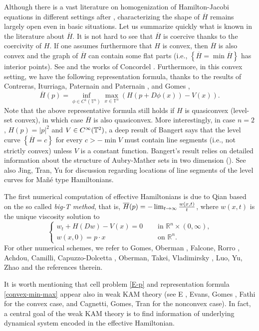 \documentclass[12pt,reqno]{amsart}
\theoremstyle{plain}
\theoremstyle{remark}
\numberwithin{equation}{section}
\newcommand{\R}{\mathbb{R}}
\newcommand{\T}{\mathbb{T}}
\newcommand{\ol}{\overline}
\begin{document}
Although there is a vast literature on homogenization of Hamilton-Jacobi equations in different settings after \cite{LPV},  characterizing the shape of $\ol H$ remains largely open even in  basic situations. 
Let us summarize quickly what is known in the literature about $\ol{H}$.
It is not hard to see that $\ol{H}$ is coercive thanks to the coercivity of $H$.
If one assumes furthermore that $H$ is convex, then $\ol{H}$ is also convex and the graph of $\ol{H}$ can contain some flat parts (i.e., $\left\{\ol H=\min \ol H\right\}$ has interior points). See \cite{LPV} and the works of Concordel \cite{Con1,Con2}. Furthermore, in this convex setting, we have the following representation formula, thanks to the results of 
Contreras, Iturriaga, Paternain and Paternain \cite{CIPP}, and Gomes \cite{Gom},
\begin{equation}\label{convex-min-max}
\ol{H}(p) = \inf_{\phi \in C^1(\T^n)} \max_{x\in \T^n} \left ( H(p+D\phi(x))- V(x) \right).
\end{equation}
Note that  the above representative formula still holds if $H$ is quasiconvex (level-set convex),
in which case $\ol{H}$ is also quasiconvex.  
More interestingly,  in case $n=2$, $H(p)=|p|^2$ and $V\in C^{\infty}(\Bbb T^2)$,  
a deep result of Bangert \cite{B2} says that the level curve $\left\{\ol H=c\right\}$ for every $c>-\min V$ must contain line segments (i.e., not strictly convex) unless $V$ is a constant function.   Bangert's result relies on detailed information about the structure of Aubry-Mather sets in two dimension (\cite{B1}).  See also Jing, Tran, Yu \cite{JTY} for discussion regarding locations of  line segments of the level curves for Ma\~n\'e type Hamiltonians.  

The first numerical computation of effective Hamiltonians  is due to  Qian \cite{Qi} based on the so called {\it big-T method}, that is,  $\ol H(p)=-\lim_{t\to \infty} {w(x,t)\over t}$,
where $w(x,t)$ is the unique viscosity solution to 
\[
\begin{cases}
w_t+H(Dw)-V(x)=0 \quad &\text{ in $\R^n\times (0, \infty)$,}\\
w(x,0)=p\cdot x  \quad &\text{ on $\R^n$}.
\end{cases}
\]
For other numerical schemes,  we refer to Gomes, Oberman \cite{GO}, 
Falcone, Rorro \cite{FR}, 
Achdou, Camilli, Capuzzo-Dolcetta \cite{ACC},
Oberman, Takei, Vladimirsky \cite{OTV}, Luo, Yu, Zhao \cite{LYZ}
and the references therein.

It is worth mentioning that cell problem \eqref{E-p} and representation formula \eqref{convex-min-max} 
appear also in weak KAM theory (see E \cite{E}, Evans, Gomes \cite{EvG},
Fathi \cite{Fa} for the convex case, and Cagnetti, Gomes, Tran \cite{CGT} for the nonconvex case).  
In fact,  a central goal of the weak KAM theory is to find information of underlying dynamical system encoded in the effective Hamiltonian.  
\end{document}

